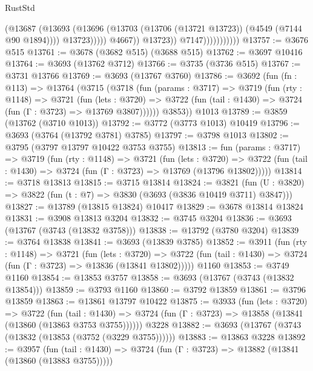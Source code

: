 \begin{lexlean}{RustStd}
\begin{coremodule}
                                        (@13687
                                          (@13693
                                            (@13696
                                              (@13703
                                                (@13706 (@13721 @13723))
                                                (@4549 (@7144 @90 @1894))))
                                            @13723)))))
                                  @4667))
                              @13723))
                          @7147)))))))))))
@13757 := @3676 @515
@13761 := @3678 (@3682 @515) (@3688 @515)
@13762 := @3697 @10416
@13764 := @3693 (@13762 @3712)
@13766 := @3735 (@3736 @515)
@13767 := @3731 @13766
@13769 := @3693 (@13767 @3760)
@13786 := @3692
    (fun (fn : @113) =>
    @13764
      (@3715
        (@3718
          (fun (params : @3717) =>
          @3719
            (fun (rty : @1148) =>
            @3721
              (fun (lets : @3720) =>
              @3722 (fun (tail : @1430) => @3724 (fun (Γ : @3723) => @13769 @3807))))))
        @3853))
    @1013
@13789 := @3859 (@13762 (@3710 @1013))
@13792 := @3772 (@3773 @1013) @10419
@13796 := @3693 (@3764 (@13792 @3781) @3785)
@13797 := @3798 @1013
@13802 := @3795 (@3797 @13797 @10422 @3753 @3755)
@13813 := fun (params : @3717) =>
  @3719
    (fun (rty : @1148) =>
    @3721
      (fun (lets : @3720) =>
      @3722 (fun (tail : @1430) => @3724 (fun (Γ : @3723) => @13769 (@13796 @13802)))))
@13814 := @3718 @13813
@13815 := @3715 @13814
@13824 := @3821
    (fun (U : @3820) => @3822 (fun (t : @7) => @3830 (@3693 (@3836 @10419 @3711) @3847)))
@13827 := @13789 (@13815 @13824) @10417
@13829 := @3678 @13814 @13824
@13831 := @3908 @13813 @3204
@13832 := @3745 @3204
@13836 := @3693 (@13767 (@3743 (@13832 @3758)))
@13838 := @13792 (@3780 @3204)
@13839 := @3764 @13838
@13841 := @3693 (@13839 @3785)
@13852 := @3911
    (fun (rty : @1148) =>
    @3721
      (fun (lets : @3720) =>
      @3722 (fun (tail : @1430) => @3724 (fun (Γ : @3723) => @13836 (@13841 @13802)))))
    @1160
@13853 := @3749 @1160
@13854 := @13853 @3757
@13858 := @3693 (@13767 (@3743 (@13832 @13854)))
@13859 := @3793 @1160
@13860 := @3792 @13859
@13861 := @3796 @13859
@13863 := @13861 @13797 @10422
@13875 := @3933
    (fun (lets : @3720) =>
    @3722
      (fun (tail : @1430) =>
      @3724 (fun (Γ : @3723) => @13858 (@13841 (@13860 (@13863 @3753 @3755))))))
    @3228
@13882 := @3693 (@13767 (@3743 (@13832 (@13853 (@3752 (@3229 @3755))))))
@13883 := @13863 @3228
@13892 := @3957
    (fun (tail : @1430) => @3724 (fun (Γ : @3723) => @13882 (@13841 (@13860 (@13883 @3755)))))

\end{coremodule}
\end{lexlean}
